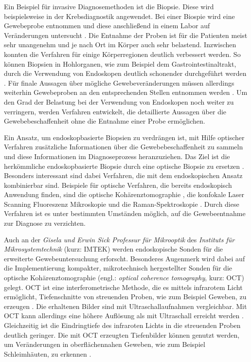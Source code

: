 Ein Beispiel für invasive Diagnosemethoden ist die Biopsie. Diese wird beispielsweise in der Krebsdiagnostik angewendet. Bei einer Biospie wird eine Gewebeprobe entnommen und diese anschließend in einem Labor auf Veränderungen untersucht \cite{huang1996}. Die Entnahme der Proben ist für die Patienten meist sehr unangenehm und je nach Ort im Körper auch sehr belastend. Inzwischen konnten die Verfahren für einige Körperregionen deutlich verbessert werden. So können Biopsien in Hohlorganen, wie zum Beispiel dem Gastrointestinaltrakt, durch die Verwendung von Endoskopen deutlich schonender durchgeführt werden \cite{vilmann2006}. Für finale Aussagen über mögliche Gewebeveränderungen müssen allerdings weiterhin Gewebeproben an den entsprechenden Stellen entnommen werden \cite{vilmann2006}. Um den Grad der Belastung bei der Verwendung von Endoskopen noch weiter zu verringern, werden Verfahren entwickelt, die detaillierte Aussagen über die Gewebebeschaffenheit ohne die Entnahme einer Probe ermöglichen.

Ein Ansatz, um endoskopbasierte Biopsien zu verdrängen ist, mit Hilfe optischer Verfahren zusätzliche Informationen über die Gewebebeschaffenheit zu sammeln und diese Informationen im Diagnoseprozess heranzuziehen. Das Ziel ist die herkömmliche endoskopbasierte Biopsie durch eine optische Biopsie zu ersetzen \cite{shukla2011}. Besonders interessant sind dabei Verfahren, die mit dem endoskopischen Ansatz kombinierbar sind. Beispiele für optische Verfahren, die bereits endoskopisch Anwendung finden, sind die optische Kohärenztomographie \cite{huang1991,sergeev1997,bouma2000,sivak2000,fujimoto2003,tran2004,liu2011}, die konfokale Laser Scanning Fluoreszenz Mikroskopie \cite{white1987,kiesslich2004,polglase2005} und die Raman-Spektroskopie \cite{bergholt2011}. Durch diese Verfahren ist es unter bestimmten Umständen möglich, auf die Gewebeentnahme zur Diagnose zu verzichten.

Auch an der \textit{Gisela und Erwin Sick Professur für Mikrooptik} des \textit{Instituts für Mikrosystemtechnik} (kurz: IMTEK) werden endoskopische Sonden für die erweiterte Gewebeuntersuchung erforscht. Besonderes Augenmerk wird dabei auf die Implementierung kompakter, mikrotechnisch hergestellter Sonden für die optische Kohärenztomographie (engl.: \textit{optical coherence tomography}, kurz: OCT) gelegt. OCT ist eine interferometrische Methode, die es mittels infrarotem Licht ermöglicht, Tiefenschnitte von streuenden Proben, wie zum Beispiel Geweben, zu erzeugen \cite{huang1991,fujimoto2003}. Die erhaltenen Bilder sind mit Ultraschallaufnahmen vergleichbar. Mit OCT kann allerdings eine höhere Auflösung als mit Ultraschall erreicht werden \cite{drexler2008}. Gleichzeitig ist die Eindringtiefe des infraroten Lichts in die streuenden Proben deutlich geringer. Die mit OCT erzeugten Tiefenbilder können genutzt werden, um Veränderungen in oberflächennahen Geweben, wie zum Beispiel Schleimhäuten, zu erkennen \cite{sergeev1997}. 

